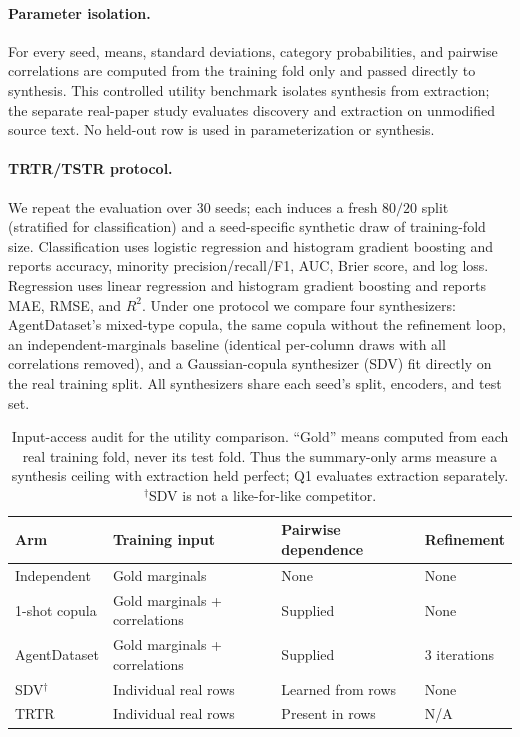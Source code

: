 \documentclass[letterpaper]{article} %
\begin{document}
\paragraph{Parameter isolation.} For every seed, means, standard deviations,
category probabilities, and pairwise correlations are computed from the
training fold only and passed directly to synthesis. This controlled utility
benchmark isolates synthesis from extraction; the separate real-paper study
evaluates discovery and extraction on unmodified source text. No held-out row is
used in parameterization or synthesis.

\paragraph{TRTR/TSTR protocol.} We repeat the evaluation over 30 seeds; each
induces a fresh $80/20$ split (stratified for classification) and a
seed-specific synthetic draw of training-fold size. Classification uses
logistic regression and histogram gradient boosting and reports accuracy,
minority precision/recall/F1, AUC, Brier score, and log loss. Regression uses
linear regression and histogram gradient boosting and reports MAE, RMSE, and
$R^2$. Under one protocol we compare four synthesizers: AgentDataset's
mixed-type copula, the same copula without the refinement loop, an
independent-marginals baseline (identical per-column draws with all correlations
removed), and a Gaussian-copula synthesizer (SDV) fit directly on the real
training split. All synthesizers share each seed's split, encoders, and test set.

\begin{table}[h]
\centering
\scriptsize
\setlength{\tabcolsep}{3pt}
\begin{tabular}{llll}
\toprule
Arm & Training input & Pairwise dependence & Refinement \\
\midrule
Independent & Gold marginals & None & None \\
1-shot copula & Gold marginals + correlations & Supplied & None \\
AgentDataset & Gold marginals + correlations & Supplied & 3 iterations \\
SDV$^\dagger$ & Individual real rows & Learned from rows & None \\
TRTR & Individual real rows & Present in rows & N/A \\
\bottomrule
\end{tabular}
\caption{Input-access audit for the utility comparison. ``Gold'' means computed
from each real training fold, never its test fold. Thus the summary-only arms
measure a synthesis ceiling with extraction held perfect; Q1 evaluates
extraction separately. $^\dagger$SDV is not a like-for-like competitor.}
\label{tab:baselineinputs}
\end{table}
\end{document}
